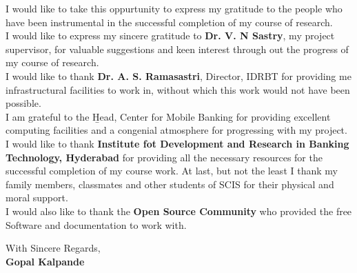 I would like to take this oppurtunity to express my gratitude to the people who have been instrumental in the successful completion of my course of research.\\
I would like to express my sincere gratitude to {\bf Dr. V. N Sastry}, my project supervisor, 
for valuable suggestions and keen interest through out the progress of my course of research. \\
I would like to thank {\bf Dr. A. S. Ramasastri}, Director, IDRBT for providing me infrastructural facilities to work in, without which this work would not have been possible.\\
I am grateful to the {\b Head, Center for Mobile Banking} for providing excellent computing facilities and a congenial atmosphere for progressing with my project. \\
I would like to thank {\bf Institute fot Development and Research in Banking Technology, Hyderabad} for providing all the necessary resources for the successful completion of my course work. At last, but not the least I thank my family members, classmates and other students of SCIS for their physical and moral support. \\
I would also like to thank the {\bf Open Source Community} who provided the free Software and documentation to work with.

\vspace{0.5in}

\begin{flushright}
With Sincere Regards,\\
{\bf Gopal Kalpande}
\end{flushright}

